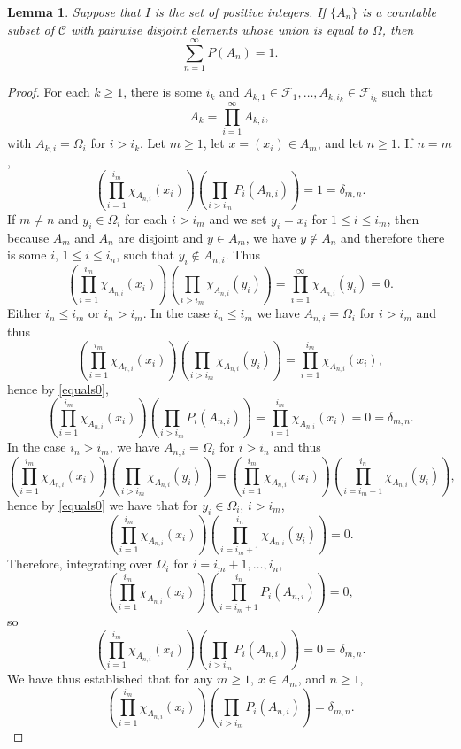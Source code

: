 \documentclass{article}
\newtheorem{lemma}[theorem]{Lemma}
\theoremstyle{definition}
\begin{document}
\begin{lemma}
Suppose that $I$ is the set of positive integers. If $\{A_n\}$ is a countable subset of $\mathscr{C}$ with pairwise disjoint elements whose union is equal to $\Omega$, then
\[
\sum_{n=1}^\infty P(A_n)=1.
\]
\label{countable}
\end{lemma}
\begin{proof}
For each $k \geq 1$, there is some $i_k$ and $A_{k,1} \in \mathscr{F}_1, \ldots,A_{k,i_k} \in \mathscr{F}_{i_k}$ such that
\[
A_k = \prod_{i=1}^\infty A_{k,i},
\]
with $A_{k,i}=\Omega_i$ for $i>i_k$. 
Let $m \geq 1$, let $x=(x_i) \in A_m$, and let $n \geq 1$. If $n=m$,  
\[
\left( \prod_{i=1}^{i_m} \chi_{A_{n,i}}(x_i) \right) \left( \prod_{i>i_m} P_i(A_{n,i}) \right) 
=1=\delta_{m,n}.
\]
If $m \neq n$ and $y_i \in \Omega_i$ for each $i>i_m$ and we set
$y_i=x_i$ for $1 \leq i \leq i_m$,
then  because $A_m$ and $A_n$ are disjoint and $y \in A_m$,
we have $y \not \in A_n$ and therefore there is some $i$,
$1 \leq i \leq i_n$, such that $y_i \not \in A_{n,i}$. 
Thus
\begin{equation}
\left( \prod_{i=1}^{i_m} \chi_{A_{n,i}}(x_i) \right) \left( \prod_{i>i_m} \chi_{A_{n,i}}(y_i) \right) = 
\prod_{i=1}^\infty \chi_{A_{n,i}}(y_i) = 0.
\label{equals0}
\end{equation}
Either $i_n \leq i_m$ or $i_n>i_m$. In the case $i_n \leq i_m$ we have
$A_{n,i} = \Omega_i$ for $i > i_m$ and thus
\[
\left( \prod_{i=1}^{i_m} \chi_{A_{n,i}}(x_i) \right) \left( \prod_{i>i_m} \chi_{A_{n,i}}(y_i) \right) 
= \prod_{i=1}^{i_m} \chi_{A_{n,i}}(x_i),
\]
hence by \eqref{equals0},
\[
\left( \prod_{i=1}^{i_m} \chi_{A_{n,i}}(x_i) \right)  \left( \prod_{i>i_m} P_i(A_{n,i}) \right)
=
\prod_{i=1}^{i_m} \chi_{A_{n,i}}(x_i)
 = 0 = \delta_{m,n}.
\]
In the case $i_n>i_m$, we have $A_{n,i}=\Omega_i$ for $i>i_n$ and thus
\[
\left( \prod_{i=1}^{i_m} \chi_{A_{n,i}}(x_i) \right) \left( \prod_{i>i_m} \chi_{A_{n,i}}(y_i) \right)=
\left( \prod_{i=1}^{i_m} \chi_{A_{n,i}}(x_i) \right) 
\left( \prod_{i=i_m+1}^{i_n} \chi_{A_{n,i}}(y_i) \right),
\]
hence by \eqref{equals0} we have that for $y_i \in \Omega_i$, $i > i_m$,
\[
\left( \prod_{i=1}^{i_m} \chi_{A_{n,i}}(x_i) \right) 
\left( \prod_{i=i_m+1}^{i_n} \chi_{A_{n,i}}(y_i) \right)=0.
\]
Therefore, integrating over $\Omega_i$ for $i=i_m+1,\ldots,i_n$,
\[
\left( \prod_{i=1}^{i_m} \chi_{A_{n,i}}(x_i) \right)  \left( \prod_{i=i_m+1}^{i_n} P_i(A_{n,i}) \right)
=0,
\]
so
\[
\left( \prod_{i=1}^{i_m} \chi_{A_{n,i}}(x_i) \right)  \left( \prod_{i>i_m} P_i(A_{n,i}) \right)=0=
\delta_{m,n}.
\]
We have thus established that for any $m \geq 1$, $x \in A_m$, and $n \geq 1$,
\begin{equation}
\left( \prod_{i=1}^{i_m} \chi_{A_{n,i}}(x_i) \right)  \left( \prod_{i>i_m} P_i(A_{n,i}) \right)=
\delta_{m,n}.
\label{deltamn}
\end{equation}


\end{proof}
\end{document}
